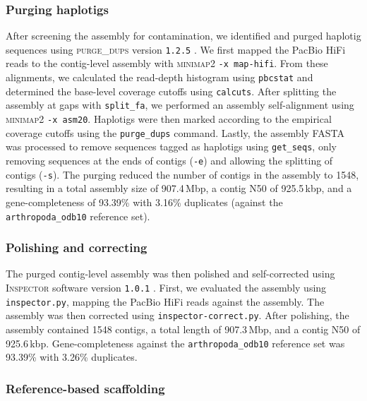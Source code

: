 \subsubsection*{Purging haplotigs}

After screening the assembly for contamination, we identified and purged haplotig
sequences using \textsc{purge\_dups} version \texttt{1.2.5}
\citep{guan_identifying_2020}.
We first mapped the PacBio HiFi reads to the contig-level assembly with
\textsc{minimap2} \texttt{-x map-hifi}.
From these alignments, we calculated the read-depth histogram using \texttt{pbcstat}
and determined the base-level coverage cutoffs using \texttt{calcuts}.
After splitting the assembly at gaps with \texttt{split\_fa}, we performed an
assembly self-alignment using \textsc{minimap2} \texttt{-x asm20}.
Haplotigs were then marked according to the empirical coverage cutoffs using the
\texttt{purge\_dups} command.
Lastly, the assembly FASTA was processed to remove sequences tagged as haplotigs using
\texttt{get\_seqs}, only removing sequences at the ends of contigs (\texttt{-e}) and
allowing the splitting of contigs (\texttt{-s}).
The purging reduced the number of contigs in the assembly to \num{1548}, resulting in
a total assembly size of 907.4\,Mbp, a contig N50 of 925.5\,kbp, and a gene-completeness
of 93.39\% with 3.16\% duplicates (against the \texttt{arthropoda\_odb10} reference
set).

\subsubsection*{Polishing and correcting}

The purged contig-level assembly was then polished and self-corrected using
\textsc{Inspector} software version \texttt{1.0.1} \citep{chen_accurate_2021}.
First, we evaluated the assembly using \texttt{inspector.py}, mapping the PacBio HiFi
reads against the assembly.
The assembly was then corrected using \texttt{inspector-correct.py}.
After polishing, the assembly contained \num{1548} contigs, a total length of 907.3\,Mbp,
and a contig N50 of 925.6\,kbp.
Gene-completeness against the \texttt{arthropoda\_odb10} reference set was 93.39\%
with 3.26\% duplicates.

\subsubsection*{Reference-based scaffolding}

